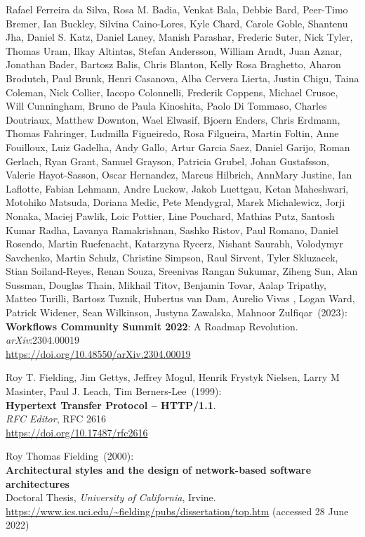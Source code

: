\begin{thebibliography}{9}
Rafael Ferreira da Silva, Rosa M. Badia, Venkat Bala, Debbie Bard, Peer-Timo Bremer, Ian Buckley, Silvina Caino-Lores, Kyle Chard, Carole Goble, Shantenu Jha, Daniel S. Katz, Daniel Laney, Manish Parashar, Frederic Suter, Nick Tyler, Thomas Uram, Ilkay Altintas, Stefan Andersson, William Arndt, Juan Aznar, Jonathan Bader, Bartosz Balis, Chris Blanton, Kelly Rosa Braghetto, Aharon Brodutch, Paul Brunk, Henri Casanova, Alba Cervera Lierta, Justin Chigu, Taina Coleman, Nick Collier, Iacopo Colonnelli, Frederik Coppens, Michael Crusoe, Will Cunningham, Bruno de Paula Kinoshita, Paolo Di Tommaso, Charles Doutriaux, Matthew Downton, Wael Elwasif, Bjoern Enders, Chris Erdmann, Thomas Fahringer, Ludmilla Figueiredo, Rosa Filgueira, Martin Foltin, Anne Fouilloux, Luiz Gadelha, Andy Gallo, Artur Garcia Saez, Daniel Garijo, Roman Gerlach, Ryan Grant, Samuel Grayson, Patricia Grubel, Johan Gustafsson, Valerie Hayot-Sasson, Oscar Hernandez, Marcus Hilbrich, AnnMary Justine, Ian Laflotte, Fabian Lehmann, Andre Luckow, Jakob Luettgau, Ketan Maheshwari, Motohiko Matsuda, Doriana Medic, Pete Mendygral, Marek Michalewicz, Jorji Nonaka, Maciej Pawlik, Loic Pottier, Line Pouchard, Mathias Putz, Santosh Kumar Radha, Lavanya Ramakrishnan, Sashko Ristov, Paul Romano, Daniel Rosendo, Martin Ruefenacht, Katarzyna Rycerz, Nishant Saurabh, Volodymyr Savchenko, Martin Schulz, Christine Simpson, Raul Sirvent, Tyler Skluzacek, Stian Soiland-Reyes, Renan Souza, Sreenivas Rangan Sukumar, Ziheng Sun, Alan Sussman, Douglas Thain, Mikhail Titov, Benjamin Tovar, Aalap Tripathy, Matteo Turilli, Bartosz Tuznik, Hubertus van Dam, Aurelio Vivas , Logan Ward, Patrick Widener, Sean Wilkinson, Justyna Zawalska, Mahnoor Zulfiqar~(2023): \\
\textbf{Workflows Community Summit 2022}: A Roadmap Revolution.\\
\emph{arXiv}:2304.00019\\
\url{https://doi.org/10.48550/arXiv.2304.00019}

Roy T. Fielding, Jim Gettys, Jeffrey Mogul, Henrik Frystyk Nielsen, Larry M Masinter, Paul J. Leach, Tim Berners-Lee~(1999): \\
\textbf{Hypertext Transfer Protocol -- HTTP/1.1}.\\
\emph{RFC Editor}, RFC 2616\\
\url{https://doi.org/10.17487/rfc2616}


Roy Thomas Fielding~(2000): \\
\textbf{Architectural styles and the design
of network-based software architectures}\\
Doctoral Thesis, 
\emph{University of California}, Irvine.\\
\url{https://www.ics.uci.edu/~fielding/pubs/dissertation/top.htm}
(accessed 28 June 2022) 



\end{thebibliography}
